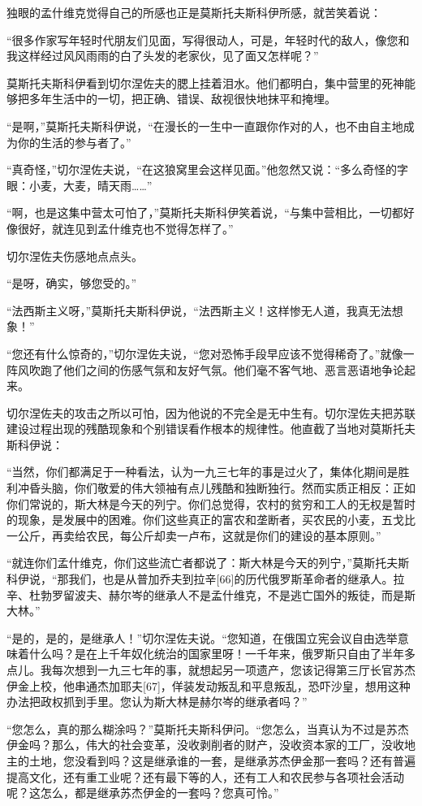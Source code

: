 独眼的孟什维克觉得自己的所感也正是莫斯托夫斯科伊所感，就苦笑着说：

“很多作家写年轻时代朋友们见面，写得很动人，可是，年轻时代的敌人，像您和我这样经过风风雨雨的白了头发的老家伙，见了面又怎样呢？”

莫斯托夫斯科伊看到切尔涅佐夫的腮上挂着泪水。他们都明白，集中营里的死神能够把多年生活中的一切，把正确、错误、敌视很快地抹平和掩埋。

“是啊，”莫斯托夫斯科伊说，“在漫长的一生中一直跟你作对的人，也不由自主地成为你的生活的参与者了。”

“真奇怪，”切尔涅佐夫说，“在这狼窝里会这样见面。”他忽然又说：“多么奇怪的字眼：小麦，大麦，晴天雨……”

“啊，也是这集中营太可怕了，”莫斯托夫斯科伊笑着说，“与集中营相比，一切都好像很好，就连见到孟什维克也不觉得怎样了。”

切尔涅佐夫伤感地点点头。

“是呀，确实，够您受的。”

“法西斯主义呀，”莫斯托夫斯科伊说，“法西斯主义！这样惨无人道，我真无法想象！”

“您还有什么惊奇的，”切尔涅佐夫说，“您对恐怖手段早应该不觉得稀奇了。”就像一阵风吹跑了他们之间的伤感气氛和友好气氛。他们毫不客气地、恶言恶语地争论起来。

切尔涅佐夫的攻击之所以可怕，因为他说的不完全是无中生有。切尔涅佐夫把苏联建设过程出现的残酷现象和个别错误看作根本的规律性。他直截了当地对莫斯托夫斯科伊说：

“当然，你们都满足于一种看法，认为一九三七年的事是过火了，集体化期间是胜利冲昏头脑，你们敬爱的伟大领袖有点儿残酷和独断独行。然而实质正相反：正如你们常说的，斯大林是今天的列宁。你们总觉得，农村的贫穷和工人的无权是暂时的现象，是发展中的困难。你们这些真正的富农和垄断者，买农民的小麦，五戈比一公斤，再卖给农民，每公斤却卖一卢布，这就是你们的建设的基本原则。”

“就连你们孟什维克，你们这些流亡者都说了：斯大林是今天的列宁，”莫斯托夫斯科伊说，“那我们，也是从普加乔夫到拉辛[66]的历代俄罗斯革命者的继承人。拉辛、杜勃罗留波夫、赫尔岑的继承人不是孟什维克，不是逃亡国外的叛徒，而是斯大林。”

“是的，是的，是继承人！”切尔涅佐夫说。“您知道，在俄国立宪会议自由选举意味着什么吗？是在上千年奴化统治的国家里呀！一千年来，俄罗斯只自由了半年多点儿。我每次想到一九三七年的事，就想起另一项遗产，您该记得第三厅长官苏杰伊金上校，他串通杰加耶夫[67]，佯装发动叛乱和平息叛乱，恐吓沙皇，想用这种办法把政权抓到手里。您认为斯大林是赫尔岑的继承者吗？”

“您怎么，真的那么糊涂吗？”莫斯托夫斯科伊问。“您怎么，当真认为不过是苏杰伊金吗？那么，伟大的社会变革，没收剥削者的财产，没收资本家的工厂，没收地主的土地，您没看到吗？这是继承谁的一套，是继承苏杰伊金那一套吗？还有普遍提高文化，还有重工业呢？还有最下等的人，还有工人和农民参与各项社会活动呢？这怎么，都是继承苏杰伊金的一套吗？您真可怜。”

